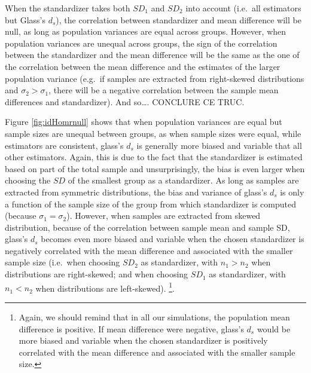 \documentclass[
  man,floatsintext]{apa6}
\begin{document}
When the standardizer takes both \(SD_1\) and \(SD_2\) into account (i.e.~all estimators but Glass's \(d_s\)), the correlation between standardizer and mean difference will be null, as long as population variances are equal across groups. However, when population variances are unequal across groups, the sign of the correlation between the standardizer and the mean difference will be the same as the one of the correlation between the mean difference and the estimates of the larger population variance (e.g.~if samples are extracted from right-skewed distributions and \(\sigma_2>\sigma_1\), there will be a negative correlation between the sample mean differences and standardizer). And so\ldots. CONCLURE CE TRUC.

Figure \ref{fig:idHomrnull} shows that when population variances are equal but sample sizes are unequal between groups, as when sample sizes were equal, while estimators are consistent, glass's \(d_s\) is generally more biased and variable that all other estimators. Again, this is due to the fact that the standardizer is estimated based on part of the total sample and unsurprisingly, the bias is even larger when choosing the \(SD\) of the smallest group as a standardizer. As long as samples are extracted from symmetric distributions, the bias and variance of glass's \(d_s\) is only a function of the sample size of the group from which standardizer is computed (because \(\sigma_1=\sigma_2\)). However, when samples are extracted from skewed distribution, because of the correlation between sample mean and sample SD, glass's \(d_s\) becomes even more biased and variable when the chosen standardizer is negatively correlated with the mean difference and associated with the smaller sample size (i.e.~when choosing \(SD_2\) as standardizer, with \(n_1 > n_2\) when distributions are right-skewed; and when choosing \(SD_1\) as standardizer, with \(n_1 < n_2\) when distributions are left-skewed). \footnote{Again, we should remind that in all our simulations, the population mean difference is positive. If mean difference were negative, glass's $d_s$ would be more biased and variable when the chosen standardizer is positively correlated with the mean difference and associated with the smaller sample size.}.
\end{document}
